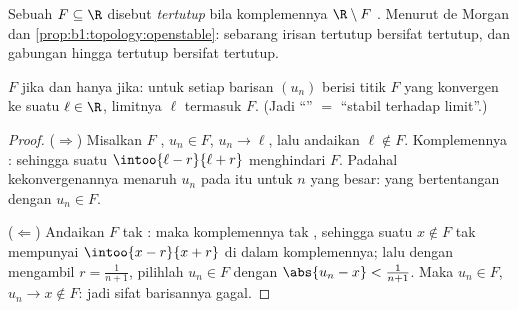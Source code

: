 \begin{definition}\label{def:b1:topology:closed}
Sebuah  $F \subseteq \R$ disebut \emph{tertutup} bila
komplemennya $\R \setminus F$ . Menurut de Morgan dan
\cref{prop:b1:topology:openstable}: sebarang irisan  tertutup
bersifat tertutup, dan gabungan hingga  tertutup bersifat tertutup.
\end{definition}

\begin{theorem}\label{thm:b1:topology:seqclosed}
 $F$  jika dan hanya jika: untuk setiap barisan $(u_n)$ berisi titik
$F$ yang konvergen ke suatu $\ell \in \R$, limitnya $\ell$ termasuk
$F$. (Jadi ``'' $=$ ``stabil terhadap limit''.)
\end{theorem}

\begin{proof}
($\Rightarrow$) Misalkan $F$ , $u_n \in F$, $u_n \to \ell$, lalu
andaikan $\ell \notin F$. Komplemennya : sehingga suatu
$\intoo{\ell - r}{\ell + r}$ menghindari $F$. Padahal kekonvergenannya menaruh $u_n$
pada  itu untuk $n$ yang besar: yang bertentangan dengan $u_n \in F$.

($\Leftarrow$) Andaikan $F$ tak : maka komplemennya tak ,
sehingga suatu $x \notin F$ tak mempunyai  $\intoo{x - r}{x + r}$ di dalam
komplemennya; lalu dengan mengambil $r = \frac{1}{n+1}$, pilihlah $u_n \in F$ dengan
$\abs{u_n - x} < \frac{1}{n+1}$. Maka $u_n \in F$, $u_n \to x \notin
F$: jadi sifat barisannya gagal.
\end{proof}

